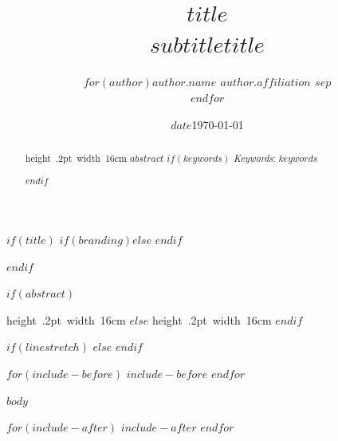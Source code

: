 \documentclass[$if(fontsize)$$fontsize$$else$10pt$endif$,$if(lang)$$babel-lang$,$endif$$if(papersize)$$papersize$$else$a4paper$endif$,$for(classoption)$$classoption$$sep$,$endfor$]{article}
\title{$title$ \vspace{0.5cm} \\ \large $subtitle$}
\title{$title$ \vspace{0.5cm}}
\author{$for(author)$\Large \bf{$author.name$}\vspace{0.05in} \newline\normalsize\emph{$author.affiliation$}  $sep$ \vspace{0.05in} \\ $endfor$}
\date{$date$}
\date{\today}
\begin{document}
$if(title)$
  $if(branding)$\vspace*{0cm}$else$\vspace*{-2cm}
  $endif$
  \begin{snugshade}%
  \maketitle
  \end{snugshade}\vspace*{0.5cm}
$endif$

$if(abstract)$
\begin{abstract}
    \hbox{\vrule height .2pt width 16cm}
    \vskip 8.5pt %
\noindent $abstract$
$if(keywords)$
\vskip 8.5pt \noindent \emph{Keywords}: $keywords$ \par
$endif$
\end{abstract}
\hbox{\vrule height .2pt width 16cm}
$else$
\hbox{\vrule height .2pt width 16cm}
$endif$


$if(linestretch)$
$else$
$endif$

$for(include-before)$
$include-before$
$endfor$

$body$

\printbibliography

$for(include-after)$
$include-after$
$endfor$
\end{document}

